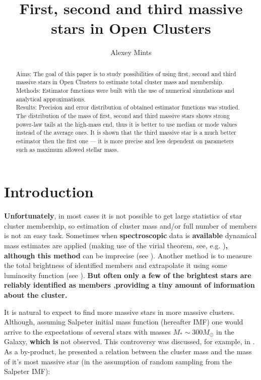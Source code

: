 \documentclass{aastex}
\title{First, second and third massive stars in Open Clusters}
\author{Alexey Mints}
\affil{University of Bielefeld, Germany}
\newcommand{\MSun}{M_\odot}
\begin{document}
\begin{abstract}
 Aims: The goal of this paper is to study possibilities of using first, second and third massive stars 
 in Open Clusters to estimate total cluster mass and membership. \\
 Methods: Estimator functions were built with the use of
 numerical simulations and analytical approximations. \\
 Results: Precision and error distribution of obtained estimator functions was studied.
 The distribution of the mass of first, second and third massive stars shows strong power-law
 tails at the high-mass end, thus it is better to use median or mode values instead of the average ones.
 It is shown that the third massive star is a much better estimator then the first one --- it is more precise and less dependent on
 parameters such as maximum allowed stellar mass.
\end{abstract}

\maketitle

\section{Introduction}
\textbf{Unfortunately}, in most cases it is not possible to get large statistics of star cluster membership,
so estimation of cluster mass and/or full number of members is not an easy task. Sometimes when \textbf{spectroscopic} data is \textbf{available} dynamical mass estimates are applied (making use of the virial theorem, see, e.g. \citet{Kouwenhoven})\textbf{, although this method}
can be imprecise (see \citet{Fleck}). 
Another method is to measure the total brightness of identified members and extrapolate it
using some luminosity function (see \citet{BB2005}). \textbf{But often only a few of the brightest}
\textbf{stars are reliably identified as members \citep{Kharchenko2003},providing a tiny amount} \textbf{ of information about the cluster.}

It is natural to expect to find more massive stars in more massive clusters. Although, assuming Salpeter \citep{Salpeter} initial mass function (hereafter IMF) one would arrive to the expectations of several stars with masses $M_{*} \sim 300 \MSun$ in the Galaxy, \textbf{which is} not observed. This controversy was discussed, for example, in \citet{Elmegreen}. As a by-product, he presented a relation between the
cluster mass and the mass of it's most massive star (in the assumption of random sampling from the Salpeter IMF):
\end{document}
